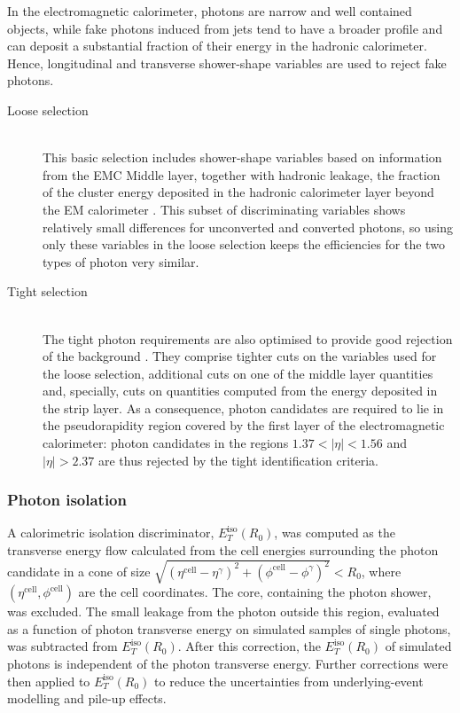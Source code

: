 \documentclass[12pt, twoside]{article}
\numberwithin{equation}{section}
\numberwithin{figure}{section}
\begin{document}
In the electromagnetic calorimeter, photons are narrow and well contained objects, while fake photons induced from jets tend to have a broader profile and can deposit a substantial fraction of their energy in the hadronic calorimeter. Hence, longitudinal and transverse shower-shape variables are used to reject fake photons.
\begin{description}
    \item[Loose selection]    \hfil \\
    This basic selection includes shower-shape variables based on information from the EMC Middle layer, together with hadronic leakage, the fraction of the cluster energy deposited in the hadronic calorimeter layer beyond the EM calorimeter \cite{photonReconstruction_2}. This subset of discriminating variables shows relatively small differences for unconverted and converted photons, so using only these variables in the loose selection keeps the efficiencies for the two types of photon very similar.

    \item[Tight selection]    \hfil \\
    The tight photon requirements are also optimised to provide good rejection of the background \cite{photonReconstruction_2}. They comprise tighter cuts on the variables used for the loose selection, additional cuts on one of the middle layer quantities and, specially, cuts on quantities computed from the energy deposited in the strip layer. As a consequence, photon candidates are required to lie in the pseudorapidity region covered by the first layer of the electromagnetic calorimeter: photon candidates in the regions $1.37 < \left| \eta \right| < 1.56$ and $\left| \eta \right| > 2.37$ are thus rejected by the tight identification criteria.
\end{description}

\newpage
\subsubsection{Photon isolation}
\label{subsubsec:PhotonIsolation}
A calorimetric isolation discriminator, $E^{\text{iso}}_{T}(R_{0})$, was computed as the transverse energy flow calculated from the cell energies surrounding the photon candidate in a cone of size $\sqrt{\left( \eta^{\text{cell}} - \eta^{\gamma} \right)^{2} + \left( \phi^{\text{cell}} - \phi^{\gamma} \right)^{2}} < R_{0}$, where $\left( \eta^{\text{cell}}, \phi^{\text{cell}} \right)$ are the cell coordinates. The core, containing the photon shower, was excluded. The small leakage from the photon outside this region, evaluated as a function of photon transverse energy on simulated samples of single photons, was subtracted from $E^{\text{iso}}_{T} (R_{0})$. After this correction, the $E^{\text{iso}}_{T} (R_{0})$ of simulated photons is independent of the photon transverse energy. Further corrections were then applied to $E^{\text{iso}}_{T} (R_{0})$ to reduce the uncertainties from underlying-event modelling and pile-up effects.
\end{document}
